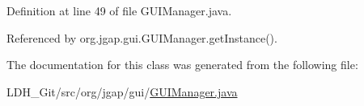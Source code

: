 Definition at line 49 of file G\-U\-I\-Manager.\-java.



Referenced by org.\-jgap.\-gui.\-G\-U\-I\-Manager.\-get\-Instance().



The documentation for this class was generated from the following file\-:\begin{DoxyCompactItemize}
\item 
L\-D\-H\-\_\-\-Git/src/org/jgap/gui/\hyperlink{_g_u_i_manager_8java}{G\-U\-I\-Manager.\-java}\end{DoxyCompactItemize}

